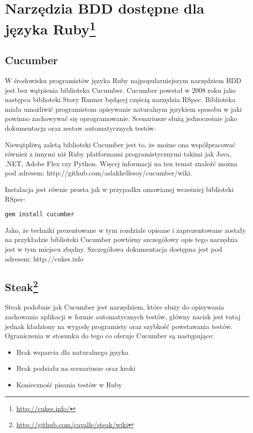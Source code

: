   \section[Narzędzia BDD dostępne dla języka Ruby]{Narzędzia BDD dostępne dla języka Ruby\footnote{\url{http://cukes.info/}\nocite{cucumber}}}
    \subsection{Cucumber}
      W środowisku programistów języka Ruby najpopularniejszym narzędziem BDD jest bez wątpienia biblioteka Cucumber. Cucumber powstał w 2008 roku jako następca biblioteki Story Runner będącej częścią narzędzia RSpec. Biblioteka miała umożliwić programistom opisywanie naturalnym językiem sposobu w jaki powinno zachowywać się oprogramowanie. Scenariusze służą jednocześnie jako dokumentacja oraz zestaw automatycznych testów. 
      
      Niewątpliwą zaletą biblioteki Cucumber jest to, że możne ona współpracować również z innymi niż Ruby platformami programistycznymi takimi jak Java, .NET, Adobe Flex czy Python. Więcej informacji na ten temat znaleźć można pod adresem: http://github.com/aslakhellesoy/cucumber/wiki.
      
      Instalacja jest równie prosta jak w przypadku omawianej wcześniej biblioteki RSpec:
      
\begin{lstlisting}
gem install cucumber
\end{lstlisting}

      Jako, że techniki prezentowane w tym rozdziale opisane i zaprezentowane zostały na przykładzie biblioteki Cucumber powtórny szczegółowy opis tego narzędzia jest w tym miejscu zbędny. Szczegółowa dokumentacja dostępna jest pod adresem: http://cukes.info
      
    \subsection[Steak]{Steak\footnote{\url{http://github.com/cavalle/steak/wiki}}}
      Steak podobnie jak Cucumber jest narzędziem, które służy do opisywania zachowania aplikacji w formie automatycznych testów, główny nacisk jest tutaj jednak kładziony na wygodę programisty oraz szybkość powstawania testów. Ograniczenia w stosunku do tego co oferuje Cucumber są następujące:
      
      \begin{itemize}
        \item Brak wsparcia dla naturalnego języka
        \item Brak podziału na scenariusze oraz kroki
        \item Konieczność pisania testów w Ruby
      \end{itemize}
      
